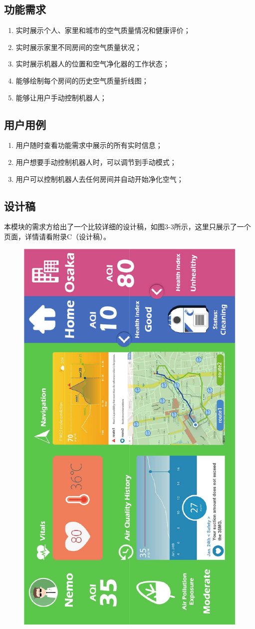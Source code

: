 \subsection{功能需求}
\begin{enumerate}
  \item 实时展示个人、家里和城市的空气质量情况和健康评价；
  \item 实时展示家里不同房间的空气质量状况；
  \item 实时展示机器人的位置和空气净化器的工作状态；
  \item 能够绘制每个房间的历史空气质量折线图；
  \item 能够让用户手动控制机器人；
\end{enumerate}

\subsection{用户用例}
\begin{enumerate}
  \item 用户随时查看功能需求中展示的所有实时信息；
  \item 用户想要手动控制机器人时，可以调节到手动模式；
  \item 用户可以控制机器人去任何房间并自动开始净化空气；
\end{enumerate}
\subsection{设计稿}
本模块的需求方给出了一个比较详细的设计稿，如图3-3所示，这里只展示了一个页面，详情请看附录C（设计稿）。
\begin{figure}[H]
 \centering
 \includegraphics[height=0.8\linewidth, page=2, angle=-90]{pdf/robotic_design.pdf}
\end{figure}

